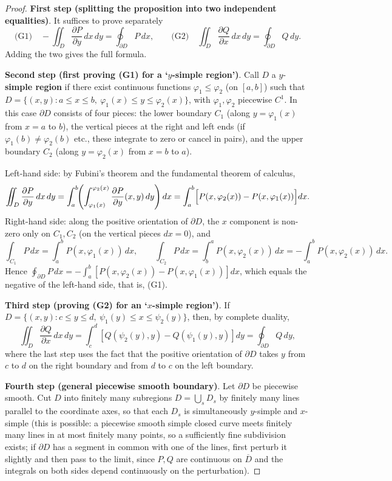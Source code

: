 \begin{proof}
\textbf{First step (splitting the proposition into two independent equalities)}. It suffices to prove separately
\[
\text{(G1)}\quad -\iint_D \frac{\partial P}{\partial y}\,dx\,dy = \oint_{\partial D}P\,dx,
\qquad
\text{(G2)}\quad \iint_D \frac{\partial Q}{\partial x}\,dx\,dy = \oint_{\partial D}Q\,dy .
\]
Adding the two gives the full formula.

\textbf{Second step (first proving (G1) for a `$y$-simple region')}. Call $D$ a $y$-\textbf{simple region} if there exist continuous functions $\varphi_1\le\varphi_2$ (on $[a,b]$) such that
$D = \{(x,y) : a\le x\le b,\ \varphi_1(x)\le y\le \varphi_2(x)\}$, with $\varphi_1,\varphi_2$ piecewise $C^1$. In this case $\partial D$ consists of four pieces: the lower boundary $C_1$ (along $y=\varphi_1(x)$ from $x=a$ to $b$), the vertical pieces at the right and left ends (if $\varphi_1(b)\ne\varphi_2(b)$ etc., these integrate to zero or cancel in pairs), and the upper boundary $C_2$ (along $y=\varphi_2(x)$ from $x=b$ to $a$).

Left-hand side: by Fubini's theorem and the fundamental theorem of calculus,
\[
\iint_D\frac{\partial P}{\partial y}\,dx\,dy
= \int_a^b\!\!\left(\int_{\varphi_1(x)}^{\varphi_2(x)}\frac{\partial P}{\partial y}(x,y)\,dy\right)dx
= \int_a^b\Bigl[P(x,\varphi_2(x))-P(x,\varphi_1(x))\Bigr]dx .
\]
Right-hand side: along the positive orientation of $\partial D$, the $x$ component is non-zero only on $C_1,C_2$ (on the vertical pieces $dx=0$), and
\[
\int_{C_1}P\,dx = \int_a^b P(x,\varphi_1(x))\,dx,
\qquad
\int_{C_2}P\,dx = \int_b^a P(x,\varphi_2(x))\,dx = -\int_a^bP(x,\varphi_2(x))\,dx .
\]
Hence $\oint_{\partial D}P\,dx = -\int_a^b[P(x,\varphi_2(x))-P(x,\varphi_1(x))]dx$, which equals the negative of the left-hand side, that is, (G1).

\textbf{Third step (proving (G2) for an `$x$-simple region')}. If $D = \{(x,y):c\le y\le d,\ \psi_1(y)\le x\le\psi_2(y)\}$, then, by complete duality,
\[
\iint_D\frac{\partial Q}{\partial x}\,dx\,dy = \int_c^d[Q(\psi_2(y),y)-Q(\psi_1(y),y)]dy = \oint_{\partial D}Q\,dy,
\]
where the last step uses the fact that the positive orientation of $\partial D$ takes $y$ from $c$ to $d$ on the right boundary and from $d$ to $c$ on the left boundary.

\textbf{Fourth step (general piecewise smooth boundary)}. Let $\partial D$ be piecewise smooth. Cut $D$ into finitely many subregions $D = \bigcup_{s}D_s$ by finitely many lines parallel to the coordinate axes, so that each $D_s$ is simultaneously $y$-simple and $x$-simple (this is possible: a piecewise smooth simple closed curve meets finitely many lines in at most finitely many points, so a sufficiently fine subdivision exists; if $\partial D$ has a segment in common with one of the lines, first perturb it slightly and then pass to the limit, since $P,Q$ are continuous on $\overline D$ and the integrals on both sides depend continuously on the perturbation).


\end{proof}
